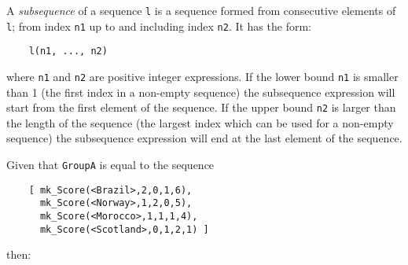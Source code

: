 \documentclass{overturerepchap}
\begin{document}
{\begin{description}
  A {\it subsequence} of a sequence {\tt l} is a sequence formed from
  consecutive elements of {\tt l}; from index {\tt n1} up to and including
  index {\tt n2}. It has the form:
  \begin{lstlisting}
    l(n1, ..., n2)
  \end{lstlisting}
  where {\tt n1} and {\tt n2} are positive integer expressions.
  If the lower bound {\tt n1} is smaller than
  1 (the first index in a non-empty sequence) the subsequence
  expression will start from the first element of the sequence.
  If the upper bound {\tt n2} is larger
  than the length of the sequence (the largest index which can be used
  for a non-empty sequence) the subsequence expression will end at the
  last element of the sequence.


\item[Examples:] Given that \texttt{GroupA} is equal to the sequence
  \begin{lstlisting}
    [ mk_Score(<Brazil>,2,0,1,6),
      mk_Score(<Norway>,1,2,0,5),
      mk_Score(<Morocco>,1,1,1,4),
      mk_Score(<Scotland>,0,1,2,1) ]
  \end{lstlisting}
\label{GroupAdef}
then:


\end{description}}
\end{document}
